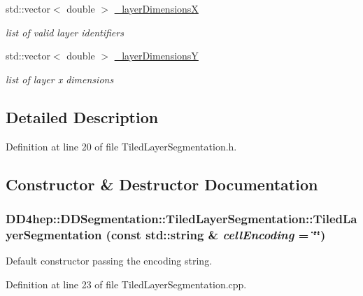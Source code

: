 \begin{DoxyCompactItemize}
std::vector$<$ double $>$ \hyperlink{class_d_d4hep_1_1_d_d_segmentation_1_1_tiled_layer_segmentation_afd897bc752982287d6184099d6badede}{\_\-layerDimensionsX}
\begin{DoxyCompactList}\small\item\em list of valid layer identifiers \item\end{DoxyCompactList}\item 
std::vector$<$ double $>$ \hyperlink{class_d_d4hep_1_1_d_d_segmentation_1_1_tiled_layer_segmentation_a48d863dc32788c26ddb770d88bb89f96}{\_\-layerDimensionsY}
\begin{DoxyCompactList}\small\item\em list of layer x dimensions \item\end{DoxyCompactList}\end{DoxyCompactItemize}


\subsection{Detailed Description}


Definition at line 20 of file TiledLayerSegmentation.h.

\subsection{Constructor \& Destructor Documentation}
\hypertarget{class_d_d4hep_1_1_d_d_segmentation_1_1_tiled_layer_segmentation_a9f5fb19402d8d5bfbfb6d3db886bdfe3}{
\subsubsection[{TiledLayerSegmentation}]{\setlength{\rightskip}{0pt plus 5cm}DD4hep::DDSegmentation::TiledLayerSegmentation::TiledLayerSegmentation (const std::string \& {\em cellEncoding} = {\ttfamily \char`\"{}\char`\"{}})}}
\label{class_d_d4hep_1_1_d_d_segmentation_1_1_tiled_layer_segmentation_a9f5fb19402d8d5bfbfb6d3db886bdfe3}


Default constructor passing the encoding string. 

Definition at line 23 of file TiledLayerSegmentation.cpp.

